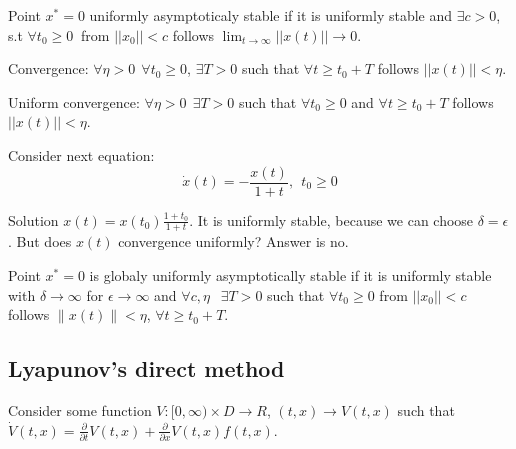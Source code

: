 \begin{Definition}
 Point $x^*=0$ uniformly asymptoticaly stable if it is uniformly stable and 
 $\exists c>0$, s.t $\forall t_0 \ge 0\ $ from $||x_0||<c$
 follows $\lim_{t\to \infty} ||x(t)|| \to 0$.
\end{Definition}


\begin{Definition}
 Convergence: $\forall \eta > 0 \ \ \forall t_0 \ge 0$, $\exists T>0$ such
 that $\forall t \ge t_0+T$ follows $||x(t)||<\eta$.
\end{Definition}

\begin{Definition}
 Uniform convergence: $\forall \eta > 0 \ \ \exists T>0$ such
 that $\forall t_0 \ge 0$ and $\forall t \ge t_0+T$ follows $||x(t)||<\eta$.
\end{Definition}


\begin{Example}
Consider next equation:
 \begin{equation}
   \dot x(t) = -\frac{x(t)}{1+t}, \ \ t_0\ge 0
 \end{equation}

 Solution $x(t)=x(t_0)\frac{1+t_0}{1+t}$. It is uniformly stable,
 because we can choose $\delta = \epsilon$. But does $x(t)$ convergence
 uniformly? Answer is no. 
\end{Example}

\begin{Definition}
 Point $x^*=0$ is globaly uniformly asymptotically stable if it is uniformly stable
 with $\delta \to \infty$ for $\epsilon \to \infty$ and $\forall c,\eta\ \ $ 
 $\exists T>0$ such that $\forall t_0\ge0$ from $||x_0||<c$ follows 
 $\|x(t)\|<\eta$, $\forall t \ge t_0 + T$.
\end{Definition}


\subsection{Lyapunov's direct method}

Consider some function $V:[0,\infty)\times D\to R$, $(t,x)\to V(t,x)$ such that
$\dot V(t,x)=\frac{\partial}{\partial t}V(t,x)+\frac{\partial}{\partial x}V(t,x) f(t,x)$.

